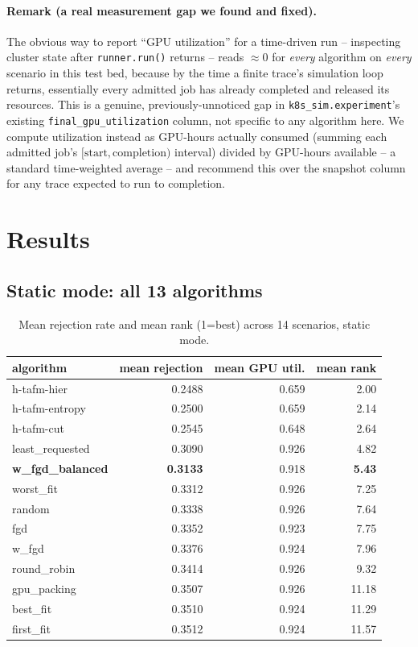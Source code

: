 \documentclass[11pt]{article}
\begin{document}
\paragraph{Remark (a real measurement gap we found and fixed).} The
obvious way to report ``GPU utilization'' for a time-driven run --
inspecting cluster state after \texttt{runner.run()} returns -- reads
$\approx 0$ for \emph{every} algorithm on \emph{every} scenario in this
test bed, because by the time a finite trace's simulation loop returns,
essentially every admitted job has already completed and released its
resources. This is a genuine, previously-unnoticed gap in
\texttt{k8s\_sim.experiment}'s existing \texttt{final\_gpu\_utilization}
column, not specific to any algorithm here. We compute utilization
instead as GPU-hours actually consumed (summing each admitted job's
$[\text{start},\text{completion})$ interval) divided by GPU-hours
available -- a standard time-weighted average -- and recommend this over
the snapshot column for any trace expected to run to completion.

\section{Results}

\subsection{Static mode: all 13 algorithms}
\begin{table}[h]
\centering
\caption{Mean rejection rate and mean rank (1=best) across 14 scenarios, static mode.}
\label{tab:static-ranking}
\small
\begin{tabular}{lrrr}
\toprule
algorithm & mean rejection & mean GPU util. & mean rank \\
\midrule
h-tafm-hier        & 0.2488 & 0.659 & 2.00 \\
h-tafm-entropy     & 0.2500 & 0.659 & 2.14 \\
h-tafm-cut         & 0.2545 & 0.648 & 2.64 \\
least\_requested   & 0.3090 & 0.926 & 4.82 \\
\textbf{w\_fgd\_balanced} & \textbf{0.3133} & 0.918 & \textbf{5.43} \\
worst\_fit         & 0.3312 & 0.926 & 7.25 \\
random             & 0.3338 & 0.926 & 7.64 \\
fgd                & 0.3352 & 0.923 & 7.75 \\
w\_fgd             & 0.3376 & 0.924 & 7.96 \\
round\_robin       & 0.3414 & 0.926 & 9.32 \\
gpu\_packing       & 0.3507 & 0.926 & 11.18 \\
best\_fit          & 0.3510 & 0.924 & 11.29 \\
first\_fit         & 0.3512 & 0.924 & 11.57 \\
\bottomrule
\end{tabular}
\end{table}
\end{document}
